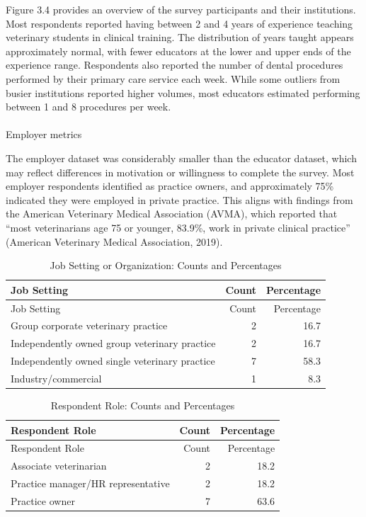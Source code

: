 \documentclass[
  12pt,
  letterpaper,
  DIV=11,
  numbers=noendperiod]{scrartcl}
\makeatletter
\let\oldparagraph\paragraph
\renewcommand{\paragraph}{
    \@ifstar
      \xxxParagraphStar
      \xxxParagraphNoStar
  }
\newcommand{\xxxParagraphStar}[1]{\oldparagraph*{#1}\mbox{}}
\newcommand{\xxxParagraphNoStar}[1]{\oldparagraph{#1}\mbox{}}
\numberwithin{figure}{section}
\numberwithin{table}{section}
\makeatother
\begin{document}
Figure 3.4 provides an overview of the survey participants and their
institutions. Most respondents reported having between 2 and 4 years of
experience teaching veterinary students in clinical training. The
distribution of years taught appears approximately normal, with fewer
educators at the lower and upper ends of the experience range.
Respondents also reported the number of dental procedures performed by
their primary care service each week. While some outliers from busier
institutions reported higher volumes, most educators estimated
performing between 1 and 8 procedures per week.

\paragraph{Employer metrics}\label{employer-metrics}

The employer dataset was considerably smaller than the educator dataset,
which may reflect differences in motivation or willingness to complete
the survey. Most employer respondents identified as practice owners, and
approximately 75\% indicated they were employed in private practice.
This aligns with findings from the American Veterinary Medical
Association (AVMA), which reported that ``most veterinarians age 75 or
younger, 83.9\%, work in private clinical practice'' (American
Veterinary Medical Association, 2019).

\begin{longtable}[]{@{}lrr@{}}
\caption{Job Setting or Organization: Counts and
Percentages}\tabularnewline
\toprule\noalign{}
Job Setting & Count & Percentage \\
\midrule\noalign{}
\endfirsthead
\toprule\noalign{}
Job Setting & Count & Percentage \\
\midrule\noalign{}
\endhead
\bottomrule\noalign{}
\endlastfoot
Group corporate veterinary practice & 2 & 16.7 \\
Independently owned group veterinary practice & 2 & 16.7 \\
Independently owned single veterinary practice & 7 & 58.3 \\
Industry/commercial & 1 & 8.3 \\
\end{longtable}

\begin{longtable}[]{@{}lrr@{}}
\caption{Respondent Role: Counts and Percentages}\tabularnewline
\toprule\noalign{}
Respondent Role & Count & Percentage \\
\midrule\noalign{}
\endfirsthead
\toprule\noalign{}
Respondent Role & Count & Percentage \\
\midrule\noalign{}
\endhead
\bottomrule\noalign{}
\endlastfoot
Associate veterinarian & 2 & 18.2 \\
Practice manager/HR representative & 2 & 18.2 \\
Practice owner & 7 & 63.6 \\
\end{longtable}
\end{document}
